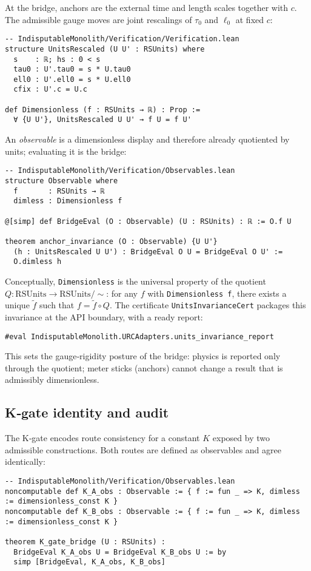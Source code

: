 \documentclass[11pt,a4paper,twoside]{article}
\numberwithin{equation}{section}
\theoremstyle{customthm}
\theoremstyle{customdef}
\theoremstyle{customrem}
\begin{document}
At the bridge, anchors are the external time and length scales together with \(c\). The admissible gauge moves are joint rescalings of \(\tau_0\) and \(\ell_0\) at fixed \(c\):
\begin{lstlisting}
-- IndisputableMonolith/Verification/Verification.lean
structure UnitsRescaled (U U' : RSUnits) where
  s    : ℝ; hs : 0 < s
  tau0 : U'.tau0 = s * U.tau0
  ell0 : U'.ell0 = s * U.ell0
  cfix : U'.c = U.c

def Dimensionless (f : RSUnits → ℝ) : Prop :=
  ∀ {U U'}, UnitsRescaled U U' → f U = f U'
\end{lstlisting}

An \emph{observable} is a dimensionless display and therefore already quotiented by units; evaluating it is the bridge:
\begin{lstlisting}
-- IndisputableMonolith/Verification/Observables.lean
structure Observable where
  f       : RSUnits → ℝ
  dimless : Dimensionless f

@[simp] def BridgeEval (O : Observable) (U : RSUnits) : ℝ := O.f U

theorem anchor_invariance (O : Observable) {U U'}
  (h : UnitsRescaled U U') : BridgeEval O U = BridgeEval O U' :=
  O.dimless h
\end{lstlisting}

Conceptually, \texttt{Dimensionless} is the universal property of the quotient \(Q : \mathrm{RSUnits} \to \mathrm{RSUnits}/{\sim}\): for any \(f\) with \texttt{Dimensionless f}, there exists a unique \(\tilde f\) such that \(f = \tilde f \circ Q\). The certificate \texttt{UnitsInvarianceCert} packages this invariance at the API boundary, with a ready report:
\begin{lstlisting}
#eval IndisputableMonolith.URCAdapters.units_invariance_report
\end{lstlisting}

This sets the gauge‐rigidity posture of the bridge: physics is reported only through the quotient; meter sticks (anchors) cannot change a result that is admissibly dimensionless.

\subsection{K‐gate identity and audit}

The K‐gate encodes route consistency for a constant \(K\) exposed by two admissible constructions. Both routes are defined as observables and agree identically:
\begin{lstlisting}
-- IndisputableMonolith/Verification/Observables.lean
noncomputable def K_A_obs : Observable := { f := fun _ => K, dimless := dimensionless_const K }
noncomputable def K_B_obs : Observable := { f := fun _ => K, dimless := dimensionless_const K }

theorem K_gate_bridge (U : RSUnits) :
  BridgeEval K_A_obs U = BridgeEval K_B_obs U := by
  simp [BridgeEval, K_A_obs, K_B_obs]
\end{lstlisting}
\end{document}
